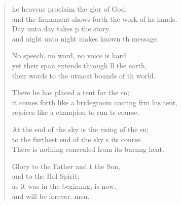 \begin{verse}
  \begin{patverse}
he heavens proclaim the glor of God,\Med\\
and the firmament shows forth the work of h\pointup{\i}s hands.\\
Day unto day takes p the story\Med\\
and night unto night makes known th message.

No speech, no word, no voice is hard\Flex\\
yet their span extends through ll the earth,\Med\\
their words to the utmost bounds of th world.

There he has placed a tent for the sn;\Flex\\
it comes forth like a bridegroom coming frm his tent,\Med\\
rejoices like a champion to run \pointup{\i}ts course.

At the end of the sky is the rising of the sn;\Flex\\
to the furthest end of the sky \pointup{\i}s its course.\Med\\
There is nothing concealed from its burn\pointup{\i}ng heat.

Glory to the Father and t the Son,\Med\\
and to the Hol Spirit:\\
as it was in the beginn\pointup{\i}ng, is now,\Med\\
and will be forever. men. 
  \end{patverse}
\end{verse}
